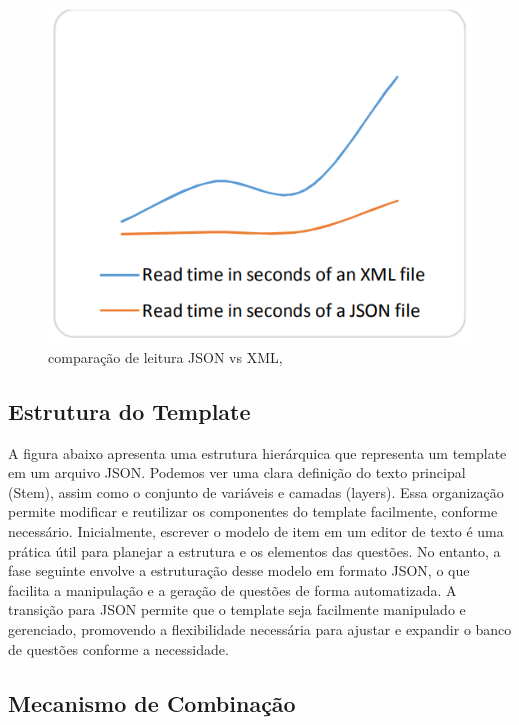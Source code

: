 \begin{figure}[ht]
	\centering
	\includegraphics[width=14cm]{./imagens/capitulo5/json-vs-xml}
	\caption{comparação de leitura JSON vs XML, \parencite{goyal2017} }
	\label{fig:json-vs-xml}
\end{figure}


\subsection{Estrutura do Template}

A figura abaixo apresenta uma estrutura hierárquica que representa um template em um arquivo JSON. Podemos ver uma clara definição do texto principal (Stem), assim como o conjunto de variáveis e camadas (layers). Essa organização permite modificar e reutilizar os componentes do template facilmente, conforme necessário. Inicialmente, escrever o modelo de item em um editor de texto é uma prática útil para planejar a estrutura e os elementos das questões. No entanto, a fase seguinte envolve a estruturação desse modelo em formato JSON, o que facilita a manipulação e a geração de questões de forma automatizada. A transição para JSON permite que o template seja facilmente manipulado e gerenciado, promovendo a flexibilidade necessária para ajustar e expandir o banco de questões conforme a necessidade.


\subsection{Mecanismo de Combinação}